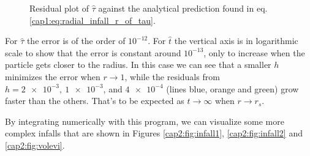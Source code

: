 \begin{figure}[h]
\begin{minipage}{0.48\textwidth}
        \caption{Residual plot of $\hat \tau$ against the analytical prediction
        found in eq. \ref{cap1:eq:radial_infall_r_of_tau}.}
        \label{cap2:fig:tau_res}
    \end{minipage}
\end{figure}

For $\hat \tau$ the error is of the order of $10^{-12}$.
For $\hat t$ the vertical axis is in logarithmic scale to show that the error is
constant around $10^{-13}$, only to increase when the particle gets closer to
the \Sh radius.
In this case we can see that a smaller $h$ minimizes the error when
$r \rightarrow 1$, while the residuals from $h = \num{2e-3}, ~ \num{1e-3}$, and
$\num{4e-4}$ (lines blue, orange and green) grow faster than the others.
That's to be expected as $t \rightarrow \infty$ when $r \rightarrow r_s$.

By integrating numerically with this program, we can visualize some more
complex infalls that are shown in Figures \ref{cap2:fig:infall1},
\ref{cap2:fig:infall2} and \ref{cap2:fig:volevi}.

